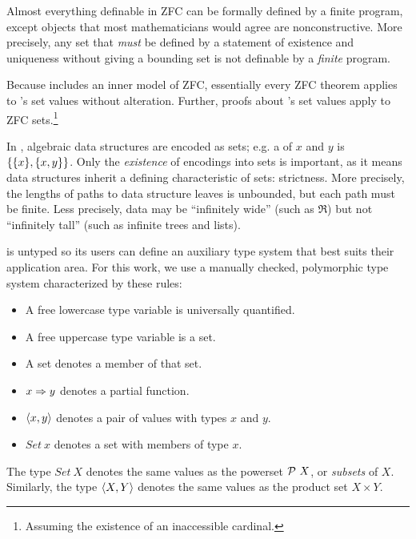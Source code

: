 \documentclass[preprint]{sigplanconf}
\begin{document}
Almost everything definable in ZFC can be formally defined by a finite \lzfclang program, except objects that most mathematicians would agree are nonconstructive.
More precisely, any set that \emph{must} be defined by a statement of existence and uniqueness without giving a bounding set is not definable by a \emph{finite} \lzfclang program.

Because \lzfclang includes an inner model of ZFC, essentially every ZFC theorem applies to \lzfclang's set values without alteration.
Further, proofs about \lzfclang's set values apply to ZFC sets.\footnote{Assuming the existence of an inaccessible cardinal.}

In \lzfclang, algebraic data structures are encoded as sets; e.g. a  of $x$ and $y$ is $\{{\{{x}\},\{{x,y}\}}\}$.
Only the \emph{existence} of encodings into sets is important, as it means data structures inherit a defining characteristic of sets: strictness.
More precisely, the lengths of paths to data structure leaves is unbounded, but each path must be finite.
Less precisely, data may be ``infinitely wide'' (such as $\Re$) but not ``infinitely tall'' (such as infinite trees and lists).


\lzfclang is untyped so its users can define an auxiliary type system that best suits their application area.
For this work, we use a manually checked, polymorphic type system characterized by these rules:
\begin{itemize}
	\item A free lowercase type variable is universally quantified.
	\item A free uppercase type variable is a set.
	\item A set denotes a member of that set.
	\item $x \Rightarrow y$ denotes a partial function.
	\item $\langle{x,y}\rangle$ denotes a pair of values with types $x$ and $y$.
	\item $Set~x$ denotes a set with members of type $x$.
\end{itemize}
The type $Set~X$ denotes the same values as the powerset $\mathcal{P}~X$, or \emph{subsets} of $X$.
Similarly, the type $\langle{X,Y}\rangle$ denotes the same values as the product set $X \times Y$.
\end{document}
